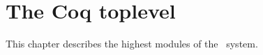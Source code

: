 
\newpage
\section*{The Coq toplevel}

\ocwsection \label{toplevel}
This chapter describes the highest modules of the \Coq\ system.
